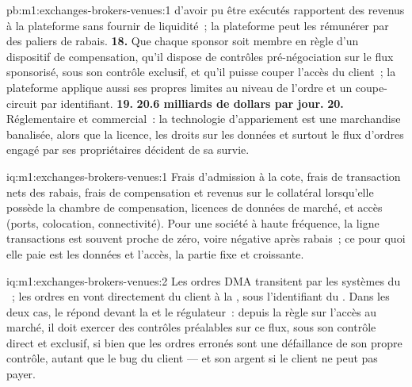 \begin{solution}{pb:m1:exchanges-brokers-venues:1}
d'avoir pu être exécutés rapportent des revenus à la plateforme sans fournir de liquidité~; la
plateforme peut les rémunérer par des paliers de rabais.
\textbf{18.} Que chaque sponsor soit membre en règle d'un dispositif de compensation,
qu'il dispose de contrôles pré-négociation sur le flux sponsorisé, sous son contrôle exclusif,
et qu'il puisse couper l'accès du client~; la plateforme applique aussi ses propres
limites au niveau de l'ordre et un coupe-circuit par identifiant.
\textbf{19.} \textbf{20.6 milliards de dollars par jour.}
\textbf{20.} Réglementaire et commercial~: la technologie d'appariement est une
marchandise banalisée, alors que la licence, les droits sur les données et surtout le flux d'ordres
engagé par ses propriétaires décident de sa survie.
\end{solution}

\begin{solution}{iq:m1:exchanges-brokers-venues:1}
Frais d'admission à la cote, frais de transaction nets des rabais, frais de compensation et revenus sur
le collatéral lorsqu'elle possède la chambre de compensation, licences de données de marché, et accès
(ports, colocation, connectivité). Pour une société à haute fréquence, la ligne transactions
est souvent proche de zéro, voire négative après rabais~; ce pour quoi elle paie est
les données et l'accès, la partie fixe et croissante.
\end{solution}

\begin{solution}{iq:m1:exchanges-brokers-venues:2}
Les ordres DMA transitent par les systèmes du ~; les ordres en  vont
directement du client à la , sous l'identifiant du . Dans
les deux cas, le  répond devant la  et le régulateur~: depuis la
règle sur l'accès au marché, il doit exercer des contrôles préalables sur ce
flux, sous son contrôle direct et exclusif, si bien que les ordres erronés sont
une défaillance de son propre contrôle, autant que le bug du client --- et son argent si le client ne
peut pas payer.
\end{solution}

